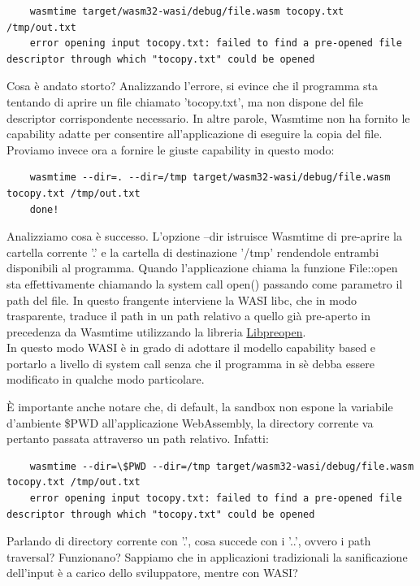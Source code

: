 \begin{lstlisting}
    wasmtime target/wasm32-wasi/debug/file.wasm tocopy.txt /tmp/out.txt
    error opening input tocopy.txt: failed to find a pre-opened file descriptor through which "tocopy.txt" could be opened
\end{lstlisting}
Cosa è andato storto? Analizzando l'errore, si evince che il programma sta tentando di aprire un file chiamato
'tocopy.txt', ma non dispone del file descriptor corrispondente necessario. In altre parole, Wasmtime non ha fornito le
capability adatte per consentire all'applicazione di eseguire la copia del file. \\
Proviamo invece ora a fornire le giuste capability in questo modo:
\begin{lstlisting}
    wasmtime --dir=. --dir=/tmp target/wasm32-wasi/debug/file.wasm tocopy.txt /tmp/out.txt
    done!
\end{lstlisting}
Analizziamo cosa è successo. L'opzione --dir istruisce Wasmtime di pre-aprire la cartella corrente '.' e la cartella
di destinazione '/tmp' rendendole entrambi disponibili al programma. Quando l'applicazione chiama la funzione File::open
sta effettivamente chiamando la system call open() passando come parametro il path del file. In questo frangente
interviene la WASI libc, che in modo trasparente, traduce il path in un path relativo a quello già pre-aperto in
precedenza da Wasmtime utilizzando la libreria \hyperref[sec:libpreopen]{Libpreopen}. \\In questo modo WASI è in grado
di adottare il modello capability based e portarlo a livello di system call senza che il programma in sè debba essere
modificato in qualche modo particolare.

È importante anche notare che, di default, la sandbox non espone la variabile d'ambiente \$PWD all'applicazione WebAssembly,
la directory corrente va pertanto passata attraverso un path relativo. Infatti:
\begin{lstlisting}
    wasmtime --dir=\$PWD --dir=/tmp target/wasm32-wasi/debug/file.wasm tocopy.txt /tmp/out.txt
    error opening input tocopy.txt: failed to find a pre-opened file descriptor through which "tocopy.txt" could be opened
\end{lstlisting}

Parlando di directory corrente con '.', cosa succede con i '..', ovvero i path traversal? Funzionano? Sappiamo che in
applicazioni tradizionali la sanificazione dell'input è a carico dello sviluppatore, mentre con WASI?

